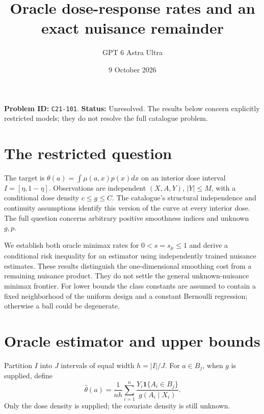 \documentclass[11pt,a4paper]{article}
\title{Oracle dose-response rates and an exact nuisance remainder}
\author{GPT 6 Astra Ultra}
\date{9 October 2026}
\theoremstyle{remark}
\newcommand{\ind}{\mathbf 1}
\begin{document}
\maketitle
\textbf{Problem ID:} \texttt{C21-101}. \textbf{Status:} Unresolved. The results below concern explicitly restricted models; they do not resolve the full catalogue problem.

\section{The restricted question}
The target is $\theta(a)=\int\mu(a,x)p(x)dx$ on an interior dose interval $I=[\eta,1-\eta]$. Observations are independent $(X,A,Y)$, $|Y|\le M$, with a conditional dose density $c\le g\le C$. The catalogue's structural independence and continuity assumptions identify this version of the curve at every interior dose. The full question concerns arbitrary positive smoothness indices and unknown $g,p$.

We establish both oracle minimax rates for $0<s=s_\mu\le1$ and derive a conditional risk inequality for an estimator using independently trained nuisance estimates. These results distinguish the one-dimensional smoothing cost from a remaining nuisance product. They do not settle the general unknown-nuisance minimax frontier. For lower bounds the class constants are assumed to contain a fixed neighborhood of the uniform design and a constant Bernoulli regression; otherwise a ball could be degenerate.

\section{Oracle estimator and upper bounds}
Partition $I$ into $J$ intervals of equal width $h=|I|/J$. For $a\in B_j$, when $g$ is supplied, define
\[
 \widehat\theta(a)=\frac1{nh}\sum_{i=1}^n
 \frac{Y_i\ind\{A_i\in B_j\}}{g(A_i\mid X_i)}.
\]
Only the dose density is supplied; the covariate density is still unknown.
\end{document}
